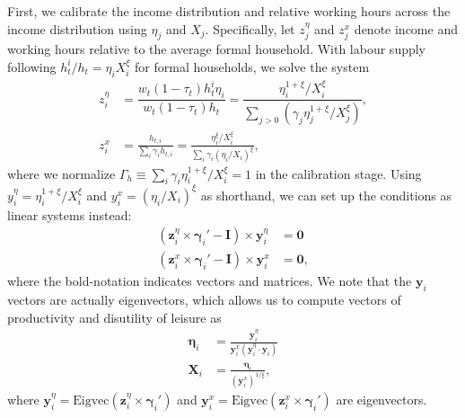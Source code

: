 \documentclass[a4paper]{article}
\begin{document}
First, we calibrate the income distribution and relative working hours across the income distribution using $\eta_j$ and $X_j$. Specifically, let $z_j^{\eta}$ and $z_j^{x}$ denote income and working hours relative to the average formal household. With labour supply following $h_t^i/h_t = \eta_iX_i^{\xi}$ for formal households, we solve the system
\begin{align*}
        z_i^{\eta} &= \dfrac{w_t(1-\tau_t)h_t^i \eta_i}{w_t(1-\tau_t)h_t} = \dfrac{\eta_i^{1+\xi}/X_i^{\xi}}{\sum_{j>0} \left(\gamma_ j\eta_j^{1+\xi}/X_j^{\xi}\right)},  \\
        z_i^{x} &= \frac{h_{t,i}}{\sum_i\gamma_i h_{t,i}} = \frac{\eta_i^{\xi}/X_i^{\xi}}{\sum_i \gamma_i(\eta_i/X_i)^{\xi}},
\end{align*}
where we normalize $\Gamma_h \equiv \sum_i \gamma_i\eta_i^{1+\xi}/X_i^{\xi} = 1$ in the calibration stage. Using $y_i^{\eta} = \eta_i^{1+\xi}/X_i^{\xi}$ and $y_i^x = (\eta_i/X_i)^{\xi}$ as shorthand, we can set up the conditions as linear systems instead:
\begin{align*}
    \left(\bm{z}_i^{\eta} \times \bm{\gamma}_i'-\bm{I}\right)\times \bm{y}_i^{\eta} &= \bm{0} \\
    \left(\bm{z}_i^{x} \times \bm{\gamma}_i'-\bm{I}\right)\times \bm{y}_i^{x} &= \bm{0},
\end{align*}
where the bold-notation indicates vectors and matrices. We note that the $\bm{y}_i$ vectors are actually eigenvectors, which allows us to compute vectors of productivity and disutility of leisure as
\begin{align} 
    \bm{\eta}_i &= \frac{\bm{y}^{\eta}_i}{\bm{y}_i^x \left(\bm{y}_i^{\eta} \cdot \bm{y}_i\right)} \label{\refeq:calibration:etai} \\
    \bm{X}_i &= \frac{\bm{\eta}_i}{(\bm{y}_i^x)^{1/\xi}}, \label{\refeq:calibration:Xi}
\end{align}
where $\bm{y}_i^{\eta} = \text{Eigvec}(\bm{z}_i^{\eta}\times \bm{\gamma}_i')$ and $\bm{y}_i^{x} = \text{Eigvec}(\bm{z}_i^{x}\times \bm{\gamma}_i')$ are eigenvectors.
\end{document}
